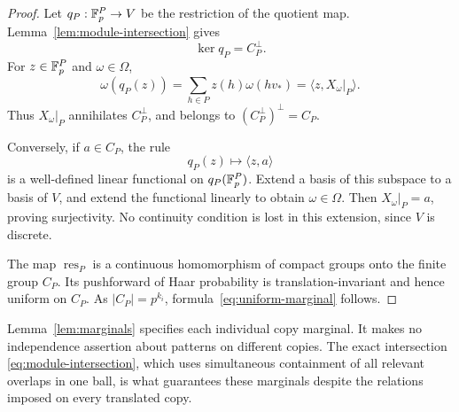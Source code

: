 \begin{proof}
Let \(q_P:\mathbb F_p^P\to V\) be the restriction of the quotient map.
Lemma~\ref{lem:module-intersection} gives
\[
  \ker q_P=C_P^\perp.
\]
For \(z\in\mathbb F_p^P\) and \(\omega\in\Omega\),
\[
  \omega(q_P(z))
  =\sum_{h\in P}z(h)\omega(hv_*)
  =\langle z,X_\omega|_P\rangle.
\]
Thus \(X_\omega|_P\) annihilates \(C_P^\perp\), and belongs to
\((C_P^\perp)^\perp=C_P\).

Conversely, if \(a\in C_P\), the rule
\[
  q_P(z)\longmapsto\langle z,a\rangle
\]
is a well-defined linear functional on \(q_P(\mathbb F_p^P)\).
Extend a basis of this subspace to a basis of \(V\), and extend the
functional linearly to obtain \(\omega\in\Omega\).
Then \(X_\omega|_P=a\), proving surjectivity.
No continuity condition is lost in this extension, since \(V\) is
discrete.

The map \(\operatorname{res}_P\) is a continuous homomorphism of compact
groups onto the finite group \(C_P\).  Its pushforward of Haar
probability is translation-invariant and hence uniform on \(C_P\).
As \(|C_P|=p^{k_i}\), formula~\eqref{eq:uniform-marginal} follows.
\end{proof}

\begin{remark}
Lemma~\ref{lem:marginals} specifies each individual copy marginal.
It makes no independence assertion about patterns on different
copies.  The exact intersection
\eqref{eq:module-intersection}, which uses simultaneous containment
of all relevant overlaps in one ball, is what guarantees these
marginals despite the relations imposed on every translated copy.
\end{remark}
